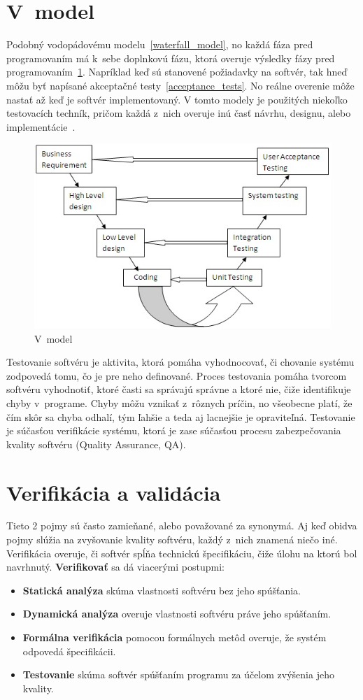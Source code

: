 \section*{V~model}
\label{v_model}
Podobný vodopádovému modelu~\ref{waterfall_model}, no každá fáza pred programovaním má k~sebe doplnkovú fázu, ktorá overuje výsledky fázy pred programovaním~\ref{v_model_fig}.
Napríklad keď sú stanovené požiadavky na softvér, tak hneď môžu byť napísané akceptačné testy~\ref{acceptance_tests}.
No reálne overenie môže nastať až keď je softvér implementovaný.
V tomto modely je použitých niekoľko testovacích techník, pričom každá z~nich overuje inú časť návrhu, designu, alebo implementácie~\cite{Patton}.
\begin{figure}[H]
\centering
\includegraphics[width=0.65\linewidth]{obrazky/v_model.png}
\caption{V~model~\cite{models}}
\label{v_model_fig}
\end{figure}

Testovanie softvéru je aktivita, ktorá pomáha vyhodnocovať, či chovanie systému zodpovedá tomu, čo je pre neho definované.
Proces testovania pomáha tvorcom softvéru vyhodnotiť, ktoré časti sa správajú správne a ktoré nie, čiže identifikuje chyby v~programe.
Chyby môžu vznikať z~rôznych príčin, no všeobecne platí, že čím skôr sa chyba odhalí, tým ľahšie a teda aj lacnejšie je opraviteľná.
Testovanie je súčasťou verifikácie systému, ktorá je zase súčasťou procesu zabezpečovania kvality softvéru (Quality Assurance, QA).~\cite{hornicky}

\section{Verifikácia a validácia}
Tieto 2 pojmy sú často zamieňané, alebo považované za synonymá.
Aj keď obidva pojmy slúžia na zvyšovanie kvality softvéru, každý z~nich znamená niečo iné.
Verifikácia overuje, či softvér spĺňa technickú špecifikáciu, čiže úlohu na ktorú bol navrhnutý.
\textbf{Verifikovať} sa dá viacerými postupmi:
\begin{itemize}
	\item \textbf{Statická analýza} skúma vlastnosti softvéru bez jeho spúšťania.
	\item \textbf{Dynamická analýza} overuje vlastnosti softvéru práve jeho spúšťaním.
	\item \textbf{Formálna verifikácia} pomocou formálnych metôd overuje, že systém odpovedá špecifikácii.
	\item \textbf{Testovanie} skúma softvér spúšťaním programu za účelom zvýšenia jeho kvality.
\end{itemize}


